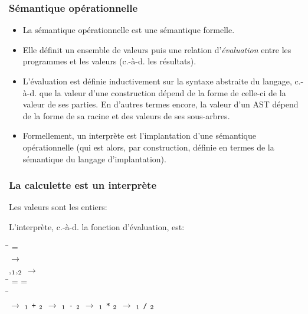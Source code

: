 %
\begin{frame}
\frametitle{Sémantique opérationnelle}

\begin{itemize}

  \item La sémantique opérationnelle est une sémantique
  formelle.

  \item Elle définit un ensemble de valeurs puis une
  relation d'\emph{évaluation} entre les programmes et les valeurs
  (c.-à-d. les résultats).

  \item L'évaluation est définie inductivement sur la
  syntaxe abstraite du langage, c.-à-d. que la valeur d'une
  construction dépend de la forme de celle-ci de la valeur de ses
  parties. En d'autres termes encore, la valeur d'un AST dépend de la
  forme de sa racine et des valeurs de ses sous-arbres.

  \item Formellement, un interprète est l'implantation
  d'une sémantique opérationnelle (qui est alors, par construction,
  définie en termes de la sémantique du langage d'implantation).

\end{itemize}

\end{frame}

%
\begin{frame}
\frametitle{La calculette est un interprète}

\label{la_calculette_est_un_interprete}

Les valeurs sont les entiers: {\small \Xtype {} \equal
{}\semi{}}

L'interprète, c.-à-d. la fonction d'évaluation, est:

{\small
 \begin{tabbing}
 \Xlet \= \Xrec \=   = \Xmatch
  \Xwith\\
 \>   \(\rightarrow\) \\
 \vbar \> 
 \lpar{},\(\sb{1}\),\(\sb{2}\)\rpar{}
 \(\rightarrow\) \\
 \> \quad \= \Xlet {} = 
 \Xand  {} = \\
 \> \> \Xin \= \Xbegin \Xmatch {} \Xwith\\
 \> \> \> \quad {} \(\rightarrow\)
 \(\sb{1}\) \texttt{+} \(\sb{2}\) \vbar
  \(\rightarrow\)
 \(\sb{1}\) \texttt{-} \(\sb{2}\) \vbar {}
 \(\rightarrow\) \(\sb{1}\) \texttt{*} \(\sb{2}\) \vbar
  \(\rightarrow\)
 \(\sb{1}\) \texttt{/} \(\sb{2}\)\\
 \> \> \> \Xend\semi{}
 \end{tabbing}
}
\end{frame}

